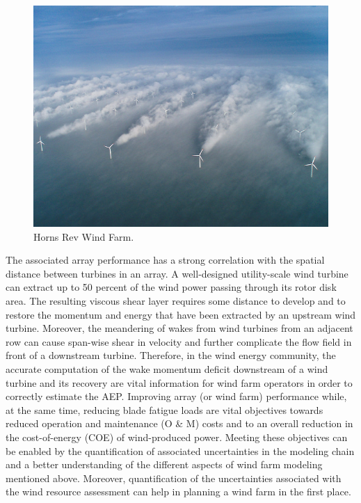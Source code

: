 \documentclass[]{aiaa-tc}%
\begin{document}
\begin{figure}
 \includegraphics[scale=0.5]{HornsRev.png}
 \caption{Horns Rev Wind Farm.}
 \label{f:HornsRev}
\end{figure}

The associated array performance has a strong correlation with the spatial distance between turbines in an array. A well-designed utility-scale wind turbine can extract up to 50 percent of the wind power passing through its rotor disk area. The resulting viscous shear layer requires some distance to develop and to restore the momentum and energy that have been extracted by an upstream wind turbine. Moreover, the meandering of wakes from wind turbines from an adjacent row can cause span-wise shear in velocity and further complicate the flow field in front of a downstream turbine. Therefore, in the wind energy community, the accurate computation of the wake momentum deficit downstream of a wind turbine and its recovery are vital information for wind farm operators in order to correctly estimate the AEP. Improving array (or wind farm) performance while, at the same time, reducing blade fatigue loads are vital objectives towards reduced operation and maintenance (O \& M) costs and to an overall reduction in the cost-of-energy (COE) of wind-produced power. Meeting these objectives can be enabled by the quantification of associated uncertainties in the modeling chain and a better understanding of the different aspects of wind farm modeling mentioned above. Moreover, quantification of the uncertainties associated with the wind resource assessment can help in planning a wind farm in the first place.
\end{document}
